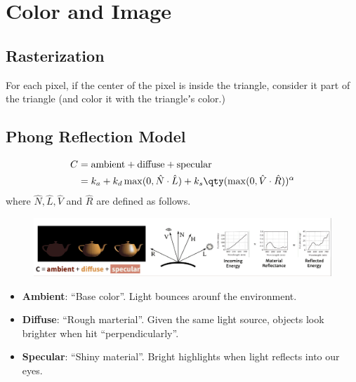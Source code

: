 \section{Color and Image}
\subsection{Rasterization}
For each pixel, if the center of the pixel is inside the triangle, consider it part of the triangle (and color it with the triangleʼs color.)
\subsection{Phong Reflection Model}
\[
	\begin{aligned}
		C&=
		\text{ambient}+\text{diffuse}+\text{specular}
		\\&=
		k_a+k_d\max(0,\hat{N}\cdot\hat{L})+k_s\qty(\max(0,\hat{V}\cdot\hat{R}))^\alpha
	\end{aligned}
\]
where $\hat{N}, \hat{L}, \hat{V}$ and $\hat{R}$ are defined as follows.
\begin{figure}[htpb]
	\centering
	\includegraphics[width=0.9\linewidth]{img/prm.png}
	\label{fig:prm}
\end{figure}
\begin{itemize}
	\vspace{-0.5em}\item \textbf{Ambient}: ``Base color''. Light bounces arounf the environment.
	\vspace{-0.5em}\item \textbf{Diffuse}: ``Rough marterial''. Given the same light source, objects look brighter when hit ``perpendicularly''.
	\vspace{-0.5em}\item \textbf{Specular}: ``Shiny material''. Bright highlights when light reflects into our eyes.
\end{itemize}
